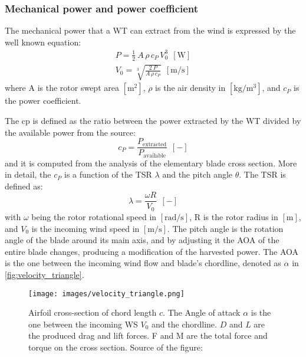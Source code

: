 \subsubsection{Mechanical power and power coefficient}\label{subsec:mech_pow_and_pow_coeff}
The mechanical power that a \acrshort{WT} can extract from the wind is expressed by the well known equation:
\begin{gather}
    P = \frac{1}{2}\ A \, \rho \, c_P \, V_0^3 \ \ \left[\si{\watt}\right] \label{eq:power} \\
    V_0 = \sqrt[3]{\frac{2 \ P}{A \, \rho \, c_P}} \ \ \left[\si{\meter \per \second}\right] 
\end{gather}
where A is the rotor swept area $\left[\si{\square \meter}\right]$, $\rho$ is the air density in $\left[\si{\kilo\gram\per\cubic\meter}\right]$, and $c_P$ is the power coefficient. 

The \acrfull{cp} is defined as the ratio between the power extracted by the \acrshort{WT} divided by the available power from the source:
\begin{equation}
    c_P = \frac{P_{\text{extracted}}}{P_{\text{available}}} \ \ \left[-\right]
    \label{eq:c_P}
\end{equation}
and it is computed from the analysis of the elementary blade cross section. More in detail, the $c_P$ is a function of the \acrfull{TSR} $\lambda$ and the pitch angle $\theta$. The \acrshort{TSR} is defined as:
\begin{equation}
    \lambda = \frac{\omega R}{V_0} \ \ \left[-\right]
    \label{eq:TSR}
\end{equation}
with $\omega$ being the rotor rotational speed in $\left[\si{\radian \per \second}\right]$, R is the rotor radius in $\left[\si{\meter}\right]$, and $V_0$ is the incoming wind speed in  $\left[\si{\meter \per \second}\right]$. The pitch angle is the rotation angle of the blade around its main axis, and by adjusting it the \acrfull{AOA} of the entire blade changes, producing a modification of the harvested power. The \acrshort{AOA} is the one between the incoming wind flow and blade's chordline, denoted as $\alpha$ in \autoref{fig:velocity_triangle}. 
\begin{figure}[htb]
    \centering
    \texttt{[image: images/velocity\_triangle.png]}
    \caption{Airfoil cross-section of chord length $c$. The Angle of attack $\alpha$ is the one between the incoming \acrshort{WS} $V_0$ and the chordline. $D$ and $L$ are the produced drag and lift forces. F and M are the total force and torque on the cross section. Source of the figure: \cite{Aerodynamics_of_wind_turbines}}
    \label{fig:velocity_triangle}
\end{figure}

